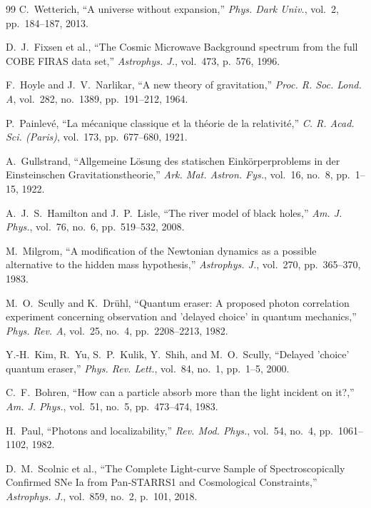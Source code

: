 \documentclass[11pt,a4paper]{article}
\begin{document}
\newpage
\begin{thebibliography}{99}
    C.~Wetterich, ``A universe without expansion,'' \textit{Phys. Dark Univ.}, vol.~2, pp.~184--187, 2013.

    D.~J.~Fixsen et al., ``The Cosmic Microwave Background spectrum from the full COBE FIRAS data set,'' \textit{Astrophys. J.}, vol.~473, p.~576, 1996.

    F.~Hoyle and J.~V.~Narlikar, ``A new theory of gravitation,'' \textit{Proc. R. Soc. Lond. A}, vol.~282, no.~1389, pp.~191--212, 1964.

    P.~Painlev\'e, ``La m\'ecanique classique et la th\'eorie de la relativit\'e,'' \textit{C. R. Acad. Sci. (Paris)}, vol.~173, pp.~677--680, 1921.

    A.~Gullstrand, ``Allgemeine L\"osung des statischen Eink\"orperproblems in der Einsteinschen Gravitationstheorie,'' \textit{Ark. Mat. Astron. Fys.}, vol.~16, no.~8, pp.~1--15, 1922.

    A.~J.~S.~Hamilton and J.~P.~Lisle, ``The river model of black holes,'' \textit{Am. J. Phys.}, vol.~76, no.~6, pp.~519--532, 2008.

    M.~Milgrom, ``A modification of the Newtonian dynamics as a possible alternative to the hidden mass hypothesis,'' \textit{Astrophys. J.}, vol.~270, pp.~365--370, 1983.

    M.~O.~Scully and K.~Dr\"uhl, ``Quantum eraser: A proposed photon correlation experiment concerning observation and 'delayed choice' in quantum mechanics,'' \textit{Phys. Rev. A}, vol.~25, no.~4, pp.~2208--2213, 1982.

    Y.-H.~Kim, R.~Yu, S.~P.~Kulik, Y.~Shih, and M.~O.~Scully, ``Delayed 'choice' quantum eraser,'' \textit{Phys. Rev. Lett.}, vol.~84, no.~1, pp.~1--5, 2000.

    C.~F.~Bohren, ``How can a particle absorb more than the light incident on it?,'' \textit{Am. J. Phys.}, vol.~51, no.~5, pp.~473--474, 1983.

    H.~Paul, ``Photons and localizability,'' \textit{Rev. Mod. Phys.}, vol.~54, no.~4, pp.~1061--1102, 1982.

    D.~M.~Scolnic et al., ``The Complete Light-curve Sample of Spectroscopically Confirmed SNe Ia from Pan-STARRS1 and Cosmological Constraints,'' \textit{Astrophys. J.}, vol.~859, no.~2, p.~101, 2018.


\end{thebibliography}
\end{document}
